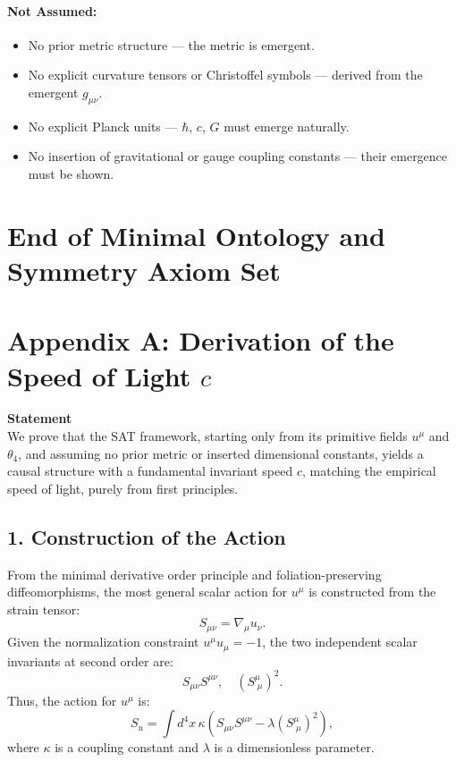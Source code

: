 \documentclass[12pt]{article}
\begin{document}
\paragraph{Not Assumed:}
\begin{itemize}
    \item No prior metric structure — the metric is emergent.
    \item No explicit curvature tensors or Christoffel symbols — derived from the emergent \( g_{\mu\nu} \).
    \item No explicit Planck units — \( \hbar \), \( c \), \( G \) must emerge naturally.
    \item No insertion of gravitational or gauge coupling constants — their emergence must be shown.
\end{itemize}

\section*{End of Minimal Ontology and Symmetry Axiom Set}
\newpage

\section*{Appendix A: Derivation of the Speed of Light \(c\)}

\textbf{Statement} \\
We prove that the SAT framework, starting only from its primitive fields \(u^\mu\) and \(\theta_4\), and assuming no prior metric or inserted dimensional constants, yields a causal structure with a fundamental invariant speed \(c\), matching the empirical speed of light, purely from first principles.

\subsection*{1. Construction of the Action}
From the minimal derivative order principle and foliation-preserving diffeomorphisms, the most general scalar action for \(u^\mu\) is constructed from the strain tensor:
\[
S_{\mu\nu} = \nabla_\mu u_\nu.
\]
Given the normalization constraint \(u^\mu u_\mu = -1\), the two independent scalar invariants at second order are:
\[
S_{\mu\nu} S^{\mu\nu}, \quad (S^\mu_{\;\mu})^2.
\]
Thus, the action for \(u^\mu\) is:
\[
S_u = \int d^4x \, \kappa \left( S_{\mu\nu} S^{\mu\nu} - \lambda (S^\mu_{\;\mu})^2 \right),
\]
where \(\kappa\) is a coupling constant and \(\lambda\) is a dimensionless parameter.
\end{document}
